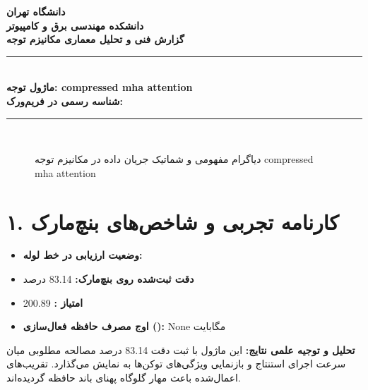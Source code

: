 \documentclass[12pt,a4paper]{article}
\begin{document}
\begin{center}
{\Large\bfseries دانشگاه تهران}\\[0.2cm]
{\large\bfseries دانشکده مهندسی برق و کامپیوتر}\\[0.2cm]
{\large\bfseries گزارش فنی و تحلیل معماری مکانیزم توجه}\\[0.5cm]
\rule{\linewidth}{1pt}\\[0.3cm]
{\LARGE\bfseries ماژول توجه: compressed mha attention}\\[0.2cm]
{\large \textbf{شناسه رسمی در فریم‌ورک:} }\\[0.2cm]
\rule{\linewidth}{1pt}\\[0.5cm]
\end{center}

\begin{figure}[H]
\centering
{}
\caption{دیاگرام مفهومی و شماتیک جریان داده در مکانیزم توجه compressed mha attention}
\end{figure}

\section*{۱. کارنامه تجربی و شاخص‌های بنچ‌مارک}
\begin{itemize}
\item \textbf{وضعیت ارزیابی در خط لوله:} 
\item \textbf{دقت ثبت‌شده روی بنچ‌مارک:} 83.14 درصد
\item \textbf{امتیاز :} 200.89
\item \textbf{اوج مصرف حافظه فعال‌سازی ():} None مگابایت
\end{itemize}
\textbf{تحلیل و توجیه علمی نتایج:} این ماژول با ثبت دقت 83.14 درصد مصالحه مطلوبی میان سرعت اجرای استنتاج و بازنمایی ویژگی‌های توکن‌ها به نمایش می‌گذارد. تقریب‌های اعمال‌شده باعث مهار گلوگاه پهنای باند حافظه گردیده‌اند.
\end{document}
